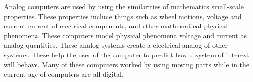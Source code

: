 \documentclass[../computer-history.tex]{subfiles}
\begin{document}
Analog computers are used by using the similarities of mathematics small-scale properties. 
These properties include things such as wheel motions, voltage and current current of electrical components, and other mathematical physical phenomena. These computers model physical phenomena voltage and current as analog quantities. 
These analog systems create a electrical analog of other systems. These help the user of the computer to predict how a system of interest will behave. 
Many of these computers worked by using moving parts while in the current age of computers are all digital.\cite{knuthwebsite}



\biblio
\end{document}
